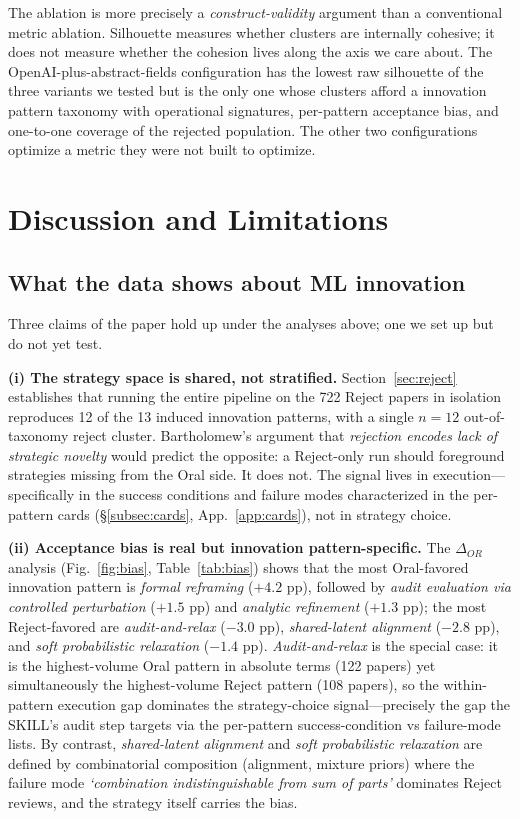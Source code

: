 \documentclass[10pt,a4paper]{article}
\begin{document}
The ablation is more precisely a \emph{construct-validity} argument than a conventional metric ablation. Silhouette measures whether clusters are internally cohesive; it does not measure whether the cohesion lives along the axis we care about. The OpenAI-plus-abstract-fields configuration has the lowest raw silhouette of the three variants we tested but is the only one whose clusters afford a innovation pattern taxonomy with operational signatures, per-pattern acceptance bias, and one-to-one coverage of the rejected population. The other two configurations optimize a metric they were not built to optimize.


\section{Discussion and Limitations}
\label{sec:discussion}

\subsection{What the data shows about ML innovation}

Three claims of the paper hold up under the analyses above; one we set up but do not yet test.

\textbf{(i) The strategy space is shared, not stratified.} Section~\ref{sec:reject} establishes that running the entire pipeline on the 722 Reject papers in isolation reproduces 12 of the 13 induced innovation patterns, with a single $n{=}12$ out-of-taxonomy reject cluster. Bartholomew's argument that \emph{rejection encodes lack of strategic novelty} would predict the opposite: a Reject-only run should foreground strategies missing from the Oral side. It does not. The signal lives in execution---specifically in the success conditions and failure modes characterized in the per-pattern cards (\S\ref{subsec:cards}, App.~\ref{app:cards}), not in strategy choice.

\textbf{(ii) Acceptance bias is real but innovation pattern-specific.} The $\Delta_{OR}$ analysis (Fig.~\ref{fig:bias}, Table~\ref{tab:bias}) shows that the most Oral-favored innovation pattern is \emph{formal reframing} (${+}4.2$ pp), followed by \emph{audit evaluation via controlled perturbation} (${+}1.5$ pp) and \emph{analytic refinement} (${+}1.3$ pp); the most Reject-favored are \emph{audit-and-relax} (${-}3.0$ pp), \emph{shared-latent alignment} (${-}2.8$ pp), and \emph{soft probabilistic relaxation} (${-}1.4$ pp). \emph{Audit-and-relax} is the special case: it is the highest-volume Oral pattern in absolute terms (122 papers) yet simultaneously the highest-volume Reject pattern (108 papers), so the within-pattern execution gap dominates the strategy-choice signal---precisely the gap the SKILL's audit step targets via the per-pattern success-condition vs failure-mode lists. By contrast, \emph{shared-latent alignment} and \emph{soft probabilistic relaxation} are defined by combinatorial composition (alignment, mixture priors) where the failure mode \emph{`combination indistinguishable from sum of parts'} dominates Reject reviews, and the strategy itself carries the bias.
\end{document}

